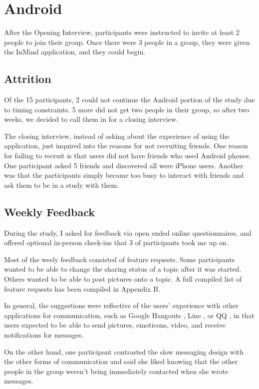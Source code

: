 \section{Android}
  After the Opening Interview, participants were instructed to invite
  at least 2 people to join their group.
  Once there were 3 people in a group,
  they were given the InMind application,
  and they could begin.

  \subsection{Attrition}
    \label{sec:Android}
    Of the 15 participants, 2 could not continue the Android portion
    of the study due to timing constraints.
    5 more did not get two people in their group,
    so after two weeks,
    we decided to call them in for a closing interview.

    The closing interview, instead of asking about the experience of using
    the application, just inquired into the reasons for not recruiting friends.
    One reason for failing to recruit is that users did not have friends
    who used Android phones.
    One participant asked 5 friends and discovered all were iPhone users.
    Another was that the participants simply became too busy to interact with
    friends and ask them to be in a study with them.

  \subsection{Weekly Feedback}
  During the study,
  I asked for feedback via open ended online questionnaires,
  and offered optional in-person check-ins that 3 of participants took me up on.

  Most of the weely feedback consisted of feature requests.
  Some participants wanted to be able to change the sharing status
  of a topic after it was started.
  Others wanted to be able to post pictures onto a topic.
  A full compiled list of feature requests has been compiled in Appendix B.

  In general, the suggestions were reflective of the users' experience with other
  applications for communication, such as Google Hangouts \cite{gchat},
  Line \cite{line}, or QQ \cite{QQ},
  in that users expected to be able to send pictures, emoticons, video,
  and receive notifications for messages.

  On the other hand, one participant contrasted the slow messaging design with
  the other forms of communication and said she liked knowing that the other
  people in the group weren't being immediately contacted when she wrote messages.

